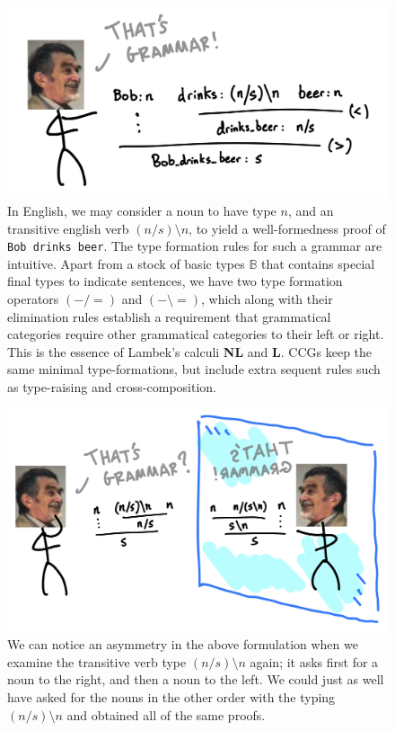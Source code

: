 \begin{figure}[h!]
\includegraphics{figures/cartoons/lambek1}
\caption{In English, we may consider a noun to have type $n$, and an transitive english verb $(n/s)\setminus n$, to yield a well-formedness proof of \texttt{Bob drinks beer}. The type formation rules for such a grammar are intuitive. Apart from a stock of basic types $\mathbb{B}$ that contains special final types to indicate sentences, we have two type formation operators $(-/=)$ and $(- \setminus =)$, which along with their elimination rules establish a requirement that grammatical categories require other grammatical categories to their left or right. This is the essence of Lambek's calculi \textbf{NL} and \textbf{L}. CCGs keep the same minimal type-formations, but include extra sequent rules such as type-raising and cross-composition.}
\end{figure}

\begin{figure}[h!]
\includegraphics{figures/cartoons/lambek2}
\caption{We can notice an asymmetry in the above formulation when we examine the transitive verb type $(n/s)\setminus n$ again; it asks first for a noun to the right, and then a noun to the left. We could just as well have asked for the nouns in the other order with the typing $(n/s)\setminus n$ and obtained all of the same proofs.}
\end{figure}


